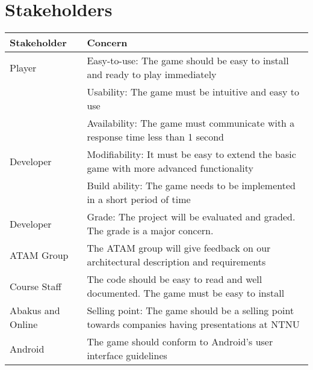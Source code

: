 \section{Stakeholders}
\label{sec:stakeholders}
\begin{tabular}{|m{}|m{}|}
\hline
Stakeholder & Concern \\ \hline
Player & Easy-to-use: The game should be easy to install and ready to play
immediately \\
& Usability: The game must be intuitive and easy to use \\
& Availability: The game must communicate with a response time less than 1
second \\ \hline
Developer & Modifiability: It must be easy to extend the basic game with more
advanced functionality\\
& Build ability: The game needs to be implemented in a short period of time\\
\hline
Developer & Grade: The project will be evaluated and graded. The grade is a major concern. \\ \hline
ATAM Group & The ATAM group will give feedback on our architectural description and requirements \\ \hline
Course Staff & The code should be easy to read and well documented. The game
must be easy to install \\ \hline
Abakus and Online & Selling point: The game should be a selling point towards
companies having presentations at NTNU\\ \hline
Android & The game should conform to Android's user interface
guidelines\cite{website:android} \\ \hline
\end{tabular}
